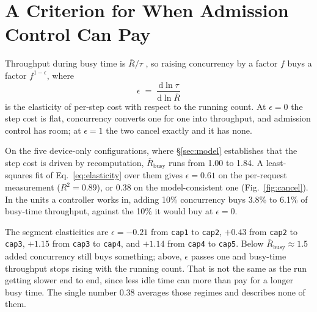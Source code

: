 \section{A Criterion for When Admission Control Can Pay}
\label{sec:criterion}

Throughput during busy time is
$\overline{R}/\tau$ \cite{denning1978}, so raising concurrency by a factor $f$
buys a factor $f^{1-\epsilon}$, where
\begin{equation}
  \epsilon \;=\; \frac{\mathrm{d}\ln \tau}{\mathrm{d}\ln \overline{R}}
  \label{eq:elasticity}
\end{equation}
is the elasticity of per-step cost with respect to the running count. At
$\epsilon = 0$ the step cost is flat, concurrency converts one for one into
throughput, and admission control has room; at $\epsilon = 1$ the two cancel
exactly and it has none.

On the five device-only configurations, where \S\ref{sec:model} establishes
that the step cost is driven by recomputation, $\overline{R}_{\text{busy}}$
runs from 1.00 to 1.84. A least-squares fit of Eq.~\ref{eq:elasticity} over
them gives $\epsilon = 0.61$ on the per-request measurement
($R^2 = 0.89$), or $0.38$ on the model-consistent one (Fig.~\ref{fig:cancel}).
In the units a controller works in, adding 10\%
concurrency buys 3.8\% to 6.1\% of busy-time throughput, against the 10\% it
would buy at $\epsilon = 0$.

The segment elasticities are $\epsilon = -0.21$ from \texttt{cap1} to
\texttt{cap2}, $+0.43$ from \texttt{cap2} to \texttt{cap3}, $+1.15$ from
\texttt{cap3} to \texttt{cap4}, and $+1.14$ from \texttt{cap4} to
\texttt{cap5}. Below $\overline{R}_{\text{busy}} \approx 1.5$ added
concurrency still buys something; above, $\epsilon$ passes one and busy-time
throughput stops rising with the running count. That is not the same as the run
getting slower end to end, since less idle time can more than pay for a longer
busy time. The single number $0.38$ averages those regimes and describes none
of them.

